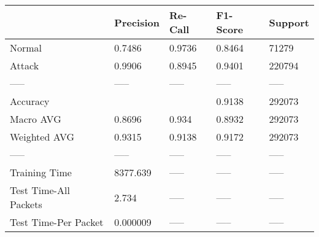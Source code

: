 \begin{tabular}{lllll}
\toprule
{} & Precision & Re-Call & F1-Score & Support \\
\midrule
Normal                &    0.7486 &  0.9736 &   0.8464 &   71279 \\
Attack                &    0.9906 &  0.8945 &   0.9401 &  220794 \\
-----                 &     ----- &   ----- &    ----- &   ----- \\
Accuracy              &           &         &   0.9138 &  292073 \\
Macro AVG             &    0.8696 &   0.934 &   0.8932 &  292073 \\
Weighted AVG          &    0.9315 &  0.9138 &   0.9172 &  292073 \\
-----                 &     ----- &   ----- &    ----- &   ----- \\
Training Time         &  8377.639 &   ----- &    ----- &   ----- \\
Test Time-All Packets &     2.734 &   ----- &    ----- &   ----- \\
Test Time-Per Packet  &  0.000009 &   ----- &    ----- &   ----- \\
\bottomrule
\end{tabular}
